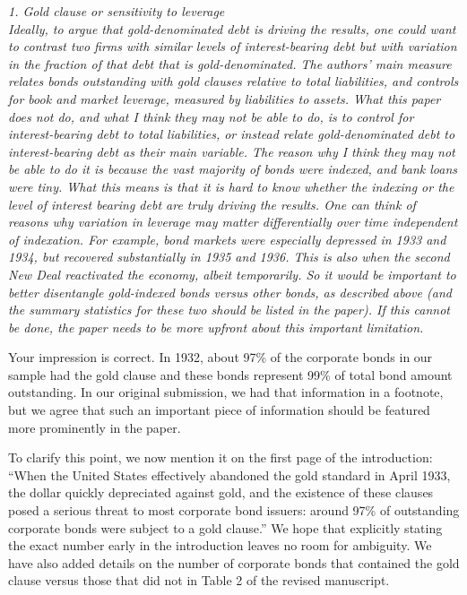 \noindent \textit{\textcolor{red!60!black}{
1. Gold clause or sensitivity to leverage\\ 
Ideally, to argue that gold-denominated debt is driving the results, one could want to contrast two firms with similar levels of interest-bearing debt but with variation in the fraction of that debt that is gold-denominated. The authors' main measure relates bonds outstanding with gold clauses relative to total liabilities, and controls for book and market leverage, measured by liabilities to assets. What this paper does not do, and what I think they may not be able to do, is to control for interest-bearing debt to total liabilities, or instead relate gold-denominated debt to interest-bearing debt as their main variable. The reason why I think they may not be able to do it is because the vast majority of bonds were indexed, and bank loans were tiny. What this means is that it is hard to know whether the indexing or the level of interest bearing debt are truly driving the results. One can think of reasons why variation in leverage may matter differentially over time independent of indexation. For example, bond markets were especially depressed in 1933 and 1934, but recovered substantially in 1935 and 1936. This is also when the second New Deal reactivated the economy, albeit temporarily. So it would be important to better disentangle gold-indexed bonds versus other bonds, as described above (and the summary statistics for these two should be listed in the paper). If this cannot be done, the paper needs to be more upfront about this important limitation.
}}
\bigskip

\noindent Your impression is correct. In 1932, about 97\% of the corporate bonds in our sample had the gold clause and these bonds represent 99\% of total bond amount outstanding. In our original submission, we had that information in a footnote, but we agree that such an important piece of information should be featured more prominently in the paper. 

To clarify this point, we now mention it on the first page of the introduction: ``When the United States effectively abandoned the gold standard in April 1933, the dollar quickly depreciated against gold, and the existence of these clauses posed a serious threat to most corporate bond issuers: around 97\% of outstanding corporate bonds were subject to a gold clause.'' We hope that explicitly stating the exact number early in the introduction leaves no room for ambiguity. We have also added details on the number of corporate bonds that contained the gold clause versus those that did not in Table 2 of the revised manuscript.


